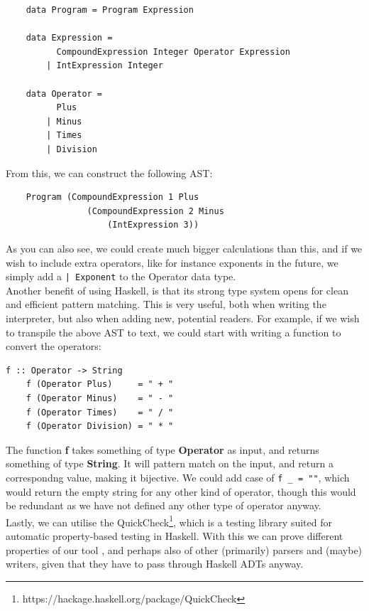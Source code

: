 \begin{verbatim}
    data Program = Program Expression

    data Expression =
          CompoundExpression Integer Operator Expression
        | IntExpression Integer

    data Operator =
          Plus
        | Minus
        | Times
        | Division
\end{verbatim}

From this, we can construct the following AST:

\begin{verbatim}
    Program (CompoundExpression 1 Plus
                (CompoundExpression 2 Minus
                    (IntExpression 3))
\end{verbatim}

As you can also see, we could create much bigger calculations than this, and if we wish to include extra operators, like for instance exponents in the future, we simply add a \texttt{| Exponent} to the Operator data type. \hfill \\

Another benefit of using Haskell, is that its strong type system opens for clean and efficient pattern matching. This is very useful, both when writing the interpreter, but also when adding new, potential readers. For example, if we wish to transpile the above AST to text, we could start with writing a function to convert the operators:

\begin{lstlisting}[caption={Haskell example to convert data type to string}, captionpos=b]
    f :: Operator -> String
    f (Operator Plus)     = " + "
    f (Operator Minus)    = " - "
    f (Operator Times)    = " / "
    f (Operator Division) = " * "
\end{lstlisting}

The function \textbf{f} takes something of type \textbf{Operator} as input, and returns something of type \textbf{String}. It will pattern match on the input, and return a correspondng value, making it bijective. We could add case of \texttt{f \_ = ""}, which would return the empty string for any other kind of operator, though this would be redundant as we have not defined any other type of operator anyway. \hfill \\

Lastly, we can utilise the QuickCheck\footnote{https://hackage.haskell.org/package/QuickCheck}, which is a testing library suited for automatic property-based testing in Haskell. With this we can prove different properties of our tool \cite{DBLP:conf/icfp/ClaessenH00}, and perhaps also of other (primarily) parsers and (maybe) writers, given that they have to pass through Haskell ADTs anyway.